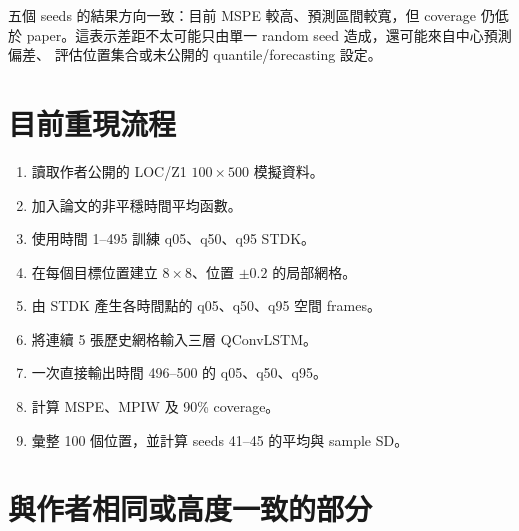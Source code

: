 \documentclass[12pt,a4paper]{article}
\begin{document}
五個 seeds 的結果方向一致：目前 MSPE 較高、預測區間較寬，但 coverage 仍低於
paper。這表示差距不太可能只由單一 random seed 造成，還可能來自中心預測偏差、
評估位置集合或未公開的 quantile/forecasting 設定。

\section{目前重現流程}

\begin{enumerate}[leftmargin=*]
  \item 讀取作者公開的 LOC/Z1 $100\times500$ 模擬資料。
  \item 加入論文的非平穩時間平均函數。
  \item 使用時間 1--495 訓練 q05、q50、q95 STDK。
  \item 在每個目標位置建立 $8\times8$、位置 $\pm0.2$ 的局部網格。
  \item 由 STDK 產生各時間點的 q05、q50、q95 空間 frames。
  \item 將連續 5 張歷史網格輸入三層 QConvLSTM。
  \item 一次直接輸出時間 496--500 的 q05、q50、q95。
  \item 計算 MSPE、MPIW 及 90\% coverage。
  \item 彙整 100 個位置，並計算 seeds 41--45 的平均與 sample SD。
\end{enumerate}

\section{與作者相同或高度一致的部分}
\end{document}

